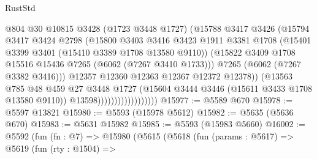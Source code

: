\begin{lexlean}{RustStd}
\begin{coremodule}
                                      @804
                                      @30
                                      @10815
                                      @3428
                                      (@1723 @3448 @1727)
                                      (@15788
                                        @3417
                                        @3426
                                        (@15794
                                          @3417
                                          @3424
                                          @2798
                                          (@15800
                                            @3403
                                            @3416
                                            @3423
                                            @1911
                                            @3381
                                            @1708
                                            (@15401 @3399 @3401 (@15410 @3389 @1708 @13580 @9110))
                                            (@15822
                                              @3409
                                              @1708
                                              @15516
                                              @15436
                                              @7265
                                              (@6062 (@7267 @3410 @1733)))
                                            @7265
                                            (@6062 (@7267 @3382 @3416)))
                                          @12357
                                          @12360
                                          @12363
                                          @12367
                                          @12372
                                          @12378))
                                      (@13563
                                        @785
                                        @48
                                        @459
                                        @27
                                        @3448
                                        @1727
                                        (@15604 @3444 @3446 (@15611 @3433 @1708 @13580 @9110))
                                        @13598))))))))))))))))))
@15977 := @5589 @670
@15978 := @5597 @13821
@15980 := @5593 (@15978 @5612)
@15982 := @5635 (@5636 @670)
@15983 := @5631 @15982
@15985 := @5593 (@15983 @5660)
@16002 := @5592
    (fun (fn : @7) =>
    @15980
      (@5615
        (@5618
          (fun (params : @5617) =>
          @5619
            (fun (rty : @1504) =>

\end{coremodule}
\end{lexlean}
